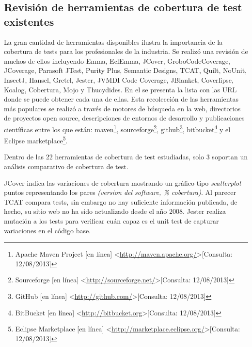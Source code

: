 \subsection{Revisión de herramientas de cobertura de test existentes}

\par La gran cantidad de herramientas disponibles ilustra la importancia de la cobertura de tests para los profesionales de la industria. Se realizó una revisión de muchos de ellos incluyendo Emma, EclEmma, JCover, GroboCodeCoverage, JCoverage, Parasoft JTest, Purity Plus, Semantic Designs, TCAT, Quilt, NoUnit, InsectJ, Hansel, Gretel, Jester, JVMDI Code Coverage, JBlanket, Coverlipse, Koalog, Cobertura, Mojo y Thucydides. En el  se presenta la lista con las URL donde se puede obtener cada una de ellas. Esta recolección de las herramientas más populares se realizó a través de motores de búsqueda en la web, directorios de proyectos open source, descripciones de entornos de desarrollo y publicaciones científicas entre los que están: maven\footnote{Apache Maven Project [en línea] \textless\url{http://maven.apache.org/}\textgreater [Consulta: 12/08/2013]}, sourceforge\footnote{Sourceforge [en línea] \textless\url{http://sourceforge.net/}\textgreater [Consulta: 12/08/2013]}, github\footnote{GitHub [en línea] \textless\url{http://github.com/}\textgreater [Consulta: 12/08/2013]}, bitbucket\footnote{BitBucket [en línea] \textless\url{http://bitbucket.org}\textgreater [Consulta: 12/08/2013]} y el Eclipse marketplace\footnote{Eclipse Marketplace [en línea] \textless\url{http://marketplace.eclipse.org/}\textgreater [Consulta: 12/08/2013]}. 

\par Dentro de las 22 herramientas de cobertura de test estudiadas, solo 3 soportan un análisis comparativo de cobertura de test. 
\par JCover indica las variaciones de cobertura mostrando un gráfico tipo \emph{scatterplot} puntos representando los pares \emph{(version del software, \% cobertura)}. Al parecer TCAT compara tests, sin embargo no hay suficiente información publicada, de hecho, su sitio web no ha sido actualizado desde el año 2008. Jester realiza mutación a los tests para verificar cuán capaz es el unit test de capturar variaciones en el código base.


